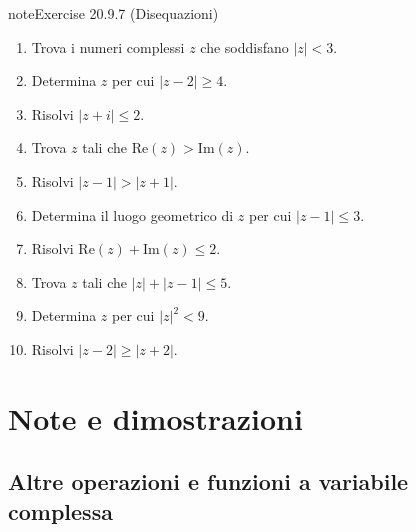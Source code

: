 \documentclass[letterpaper,10pt,italian]{jupyterBook}
\begin{document}
\begin{sphinxadmonition}{note}{Exercise 20.9.7 (Disequazioni)}


\begin{enumerate}
%
\item {} 
\sphinxAtStartPar
Trova i numeri complessi \(z\) che soddisfano \(|z| < 3\).

\item {} 
\sphinxAtStartPar
Determina \(z\) per cui \(|z - 2| \geq 4\).

\item {} 
\sphinxAtStartPar
Risolvi \(|z + i| \leq 2\).

\item {} 
\sphinxAtStartPar
Trova \(z\) tali che \(\text{Re}(z) > \text{Im}(z)\).

\item {} 
\sphinxAtStartPar
Risolvi \(|z - 1| > |z + 1|\).

\item {} 
\sphinxAtStartPar
Determina il luogo geometrico di \(z\) per cui \(|z - 1| \leq 3\).

\item {} 
\sphinxAtStartPar
Risolvi \(\text{Re}(z) + \text{Im}(z) \leq 2\).

\item {} 
\sphinxAtStartPar
Trova \(z\) tali che \(|z| + |z - 1| \leq 5\).

\item {} 
\sphinxAtStartPar
Determina \(z\) per cui \(|z|^2 < 9\).

\item {} 
\sphinxAtStartPar
Risolvi \(|z - 2| \geq |z + 2|\).

\end{enumerate}
\end{sphinxadmonition}

\sphinxstepscope


\section{Note e dimostrazioni}
\label{\detokenize{ch/algebra/complex-algebra-notes:note-e-dimostrazioni}}\label{\detokenize{ch/algebra/complex-algebra-notes:math-hs-algebra-complex-notes}}\label{\detokenize{ch/algebra/complex-algebra-notes::doc}}

\subsection{Altre operazioni e funzioni a variabile complessa}
\label{\detokenize{ch/algebra/complex-algebra-notes:altre-operazioni-e-funzioni-a-variabile-complessa}}\label{\detokenize{ch/algebra/complex-algebra-notes:math-hs-algebra-complex-notes-fun}}
\end{document}
